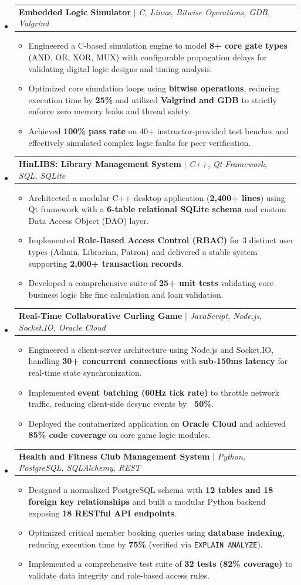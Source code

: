 \documentclass[letterpaper,11pt]{article}
\makeatletter
\newcommand{\resumeItem}[1]{
  \item\small{
    {#1 \vspace{-2pt}}
  }
}
\newcommand{\resumeProjectHeading}[2]{
    \item
    \begin{tabular*}{0.97\textwidth}{l@{\extracolsep{\fill}}r}
      \small#1 & #2 \\
    \end{tabular*}\vspace{-7pt}
}
\newcommand{\resumeSubHeadingListStart}{\begin{itemize}[leftmargin=0.15in, label={}]}
\newcommand{\resumeSubHeadingListEnd}{\end{itemize}}
\newcommand{\resumeItemListStart}{\begin{itemize}}
\newcommand{\resumeItemListEnd}{\end{itemize}\vspace{-5pt}}
\makeatother
\begin{document}
\resumeSubHeadingListStart
\resumeProjectHeading{\textbf{Embedded Logic Simulator} $|$ \emph{C, Linux, Bitwise Operations, GDB, Valgrind}}{} \n \resumeItemListStart \n \resumeItem{Engineered a C-based simulation engine to model \textbf{8+ core gate types} (AND, OR, XOR, MUX) with configurable propagation delays for validating digital logic designs and timing analysis.} \n \resumeItem{Optimized core simulation loops using \textbf{bitwise operations}, reducing execution time by \textbf{25\%} and utilized \textbf{Valgrind and GDB} to strictly enforce zero memory leaks and thread safety.} \n \resumeItem{Achieved \textbf{100\% pass rate} on 40+ instructor-provided test benches and effectively simulated complex logic faults for peer verification.} \n \resumeItemListEnd \n \vspace{6pt} \n \resumeProjectHeading{\textbf{HinLIBS: Library Management System} $|$ \emph{C++, Qt Framework, SQL, SQLite}}{} \n \resumeItemListStart \n \resumeItem{Architected a modular C++ desktop application (\textbf{2,400+ lines}) using Qt framework with a \textbf{6-table relational SQLite schema} and custom Data Access Object (DAO) layer.} \n \resumeItem{Implemented \textbf{Role-Based Access Control (RBAC)} for 3 distinct user types (Admin, Librarian, Patron) and delivered a stable system supporting \textbf{2,000+ transaction records}.} \n \resumeItem{Developed a comprehensive suite of \textbf{25+ unit tests} validating core business logic like fine calculation and loan validation.} \n \resumeItemListEnd \n \vspace{6pt} \n \resumeProjectHeading{\textbf{Real-Time Collaborative Curling Game} $|$ \emph{JavaScript, Node.js, Socket.IO, Oracle Cloud}}{} \n \resumeItemListStart \n \resumeItem{Engineered a client-server architecture using Node.js and Socket.IO, handling \textbf{30+ concurrent connections} with \textbf{sub-150ms latency} for real-time state synchronization.} \n \resumeItem{Implemented \textbf{event batching (60Hz tick rate)} to throttle network traffic, reducing client-side desync events by \textbf{~50\%}.} \n \resumeItem{Deployed the containerized application on \textbf{Oracle Cloud} and achieved \textbf{85\% code coverage} on core game logic modules.} \n \resumeItemListEnd \n \vspace{6pt} \n \resumeProjectHeading{\textbf{Health and Fitness Club Management System} $|$ \emph{Python, PostgreSQL, SQLAlchemy, REST}}{} \n \resumeItemListStart \n \resumeItem{Designed a normalized PostgreSQL schema with \textbf{12 tables and 18 foreign key relationships} and built a modular Python backend exposing \textbf{18 RESTful API endpoints}.} \n \resumeItem{Optimized critical member booking queries using \textbf{database indexing}, reducing execution time by \textbf{75\%} (verified via \texttt{EXPLAIN ANALYZE}).} \n \resumeItem{Implemented a comprehensive test suite of \textbf{32 tests (82\% coverage)} to validate data integrity and role-based access rules.} \n \resumeItemListEnd
\resumeSubHeadingListEnd
\end{document}
